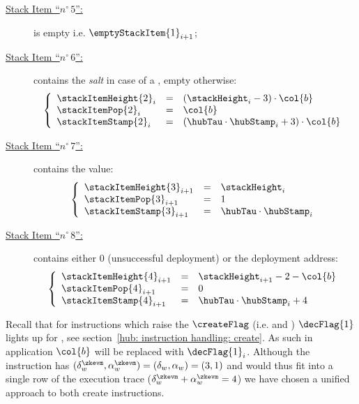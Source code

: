 \begin{description}
	\item[\underline{Stack Item ``$n^\circ\,5$'':}] is empty i.e. $\emptyStackItem{1}_{i + 1}$;
	\item[\underline{Stack Item ``$n^\circ\,6$'':}] contains the \emph{salt} in case of a , empty otherwise:
	\[
	\left\{
	\begin{array}{lcl}
		\stackItemHeight{2}_{i}	& = & (\stackHeight_{i} - 3) \cdot \col{b} \\
		\stackItemPop{2}_{i}	& = & \col{b} \\
		\stackItemStamp{2}_{i}	& = & (\hubTau \cdot \hubStamp_{i} + 3) \cdot \col{b} \\
	\end{array}
	\right.
	\]
	\item[\underline{Stack Item ``$n^\circ\,7$'':}] contains the value:
	\[
	\left\{
	\begin{array}{lcl}
		\stackItemHeight{3}_{i + 1}	& = & \stackHeight_{i} \\
		\stackItemPop{3}_{i + 1}	& = & 1 \\
		\stackItemStamp{3}_{i + 1}	& = & \hubTau \cdot \hubStamp_{i} \\
	\end{array}
	\right.
	\]
	\item[\underline{Stack Item ``$n^\circ\,8$'':}] contains either $0$ (unsuccessful deployment) or the deployment address:
	\[
	\left\{
	\begin{array}{lcl}
		\stackItemHeight{4}_{i + 1}	& = & \stackHeight_{i + 1} - 2 - \col{b} \\
		\stackItemPop{4}_{i + 1}	& = & 0 \\
		\stackItemStamp{4}_{i + 1}	& = & \hubTau \cdot \hubStamp_{i} + 4 \\
	\end{array}
	\right.
	\]
\end{description}
Recall that for instructions which raise the $\createFlag$ (i.e.  and ) $\decFlag{1}$ lights up for , see section~\ref{hub: instruction handling: create}.
As such in application $\col{b}$ will be replaced with $\decFlag{1}_{i}$.
\saNote{} Although the  instruction has $(\delta_{w}^\zkevm, \alpha_{w}^\zkevm) = (\delta_{w}, \alpha_{w}) = (3,1)$ and would thus fit into a single row of the execution trace ($\delta_{w}^\zkevm + \alpha_{w}^\zkevm = 4$) we have chosen a unified approach to both create instructions.



